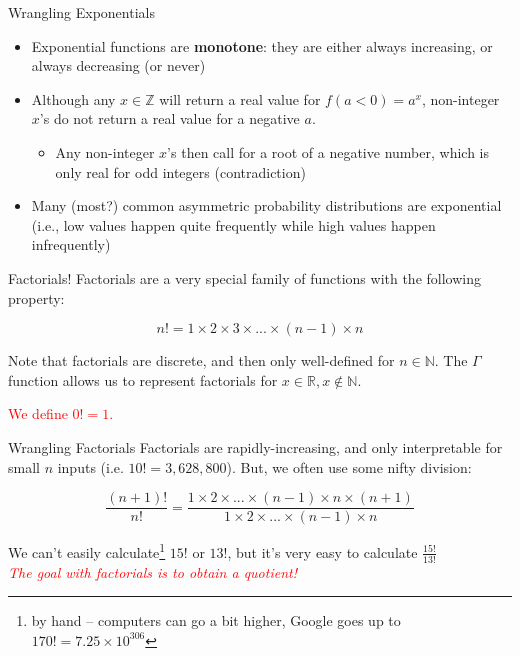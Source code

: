 \documentclass[10pt]{beamer}
\begin{document}
\begin{frame}{Wrangling Exponentials}

\begin{itemize}
    \item Exponential functions are \textbf{monotone}: they are either always increasing, or always decreasing (or never) \pause
    \item Although any $x \in \mathbb{Z}$ will return a real value for $f(a < 0) = a^x$, non-integer $x$'s do not return a real value for a negative $a$.
    \begin{itemize}
        \item Any non-integer $x$'s then call for a root of a negative number, which is only real for odd integers (contradiction)
    \end{itemize} \pause
    \item Many (most?) common asymmetric probability distributions are exponential (i.e., low values happen quite frequently while high values happen infrequently)
\end{itemize}

\end{frame}

\begin{frame}{Factorials!}
    Factorials are a very special family of functions with the following property:

    \[n! = 1 \times 2 \times 3 \times ... \times (n-1) \times n\]

    Note that factorials are discrete, and then only well-defined for $n \in \mathbb{N}$. The $\Gamma$ function allows us to represent factorials for $x \in \mathbb{R}, x \notin \mathbb{N}$. \\

    \vspace{.5cm}

    \textcolor{red}{We define $0! = 1$.}
\end{frame}

\begin{frame}{Wrangling Factorials}
    Factorials are rapidly-increasing, and only interpretable for small $n$ inputs (i.e. $10! = 3,628,800$). But, we often use some nifty division:

    \[\frac{(n+1)!}{n!} = \frac{1 \times 2 \times ... \times (n-1) \times n \times (n+1)}{1 \times 2 \times... \times (n-1) \times n}\]

    We can't easily calculate\footnote{by hand -- computers can go a bit higher, Google goes up to $170! = 7.25 \times 10^{306}$} $15!$ or $13!$, but it's very easy to calculate $\frac{15!}{13!}$ \\

    \vspace{.5cm}
\pause
    \textit{\textcolor{red}{The goal with factorials is to obtain a quotient!}}
\end{frame}
\end{document}
